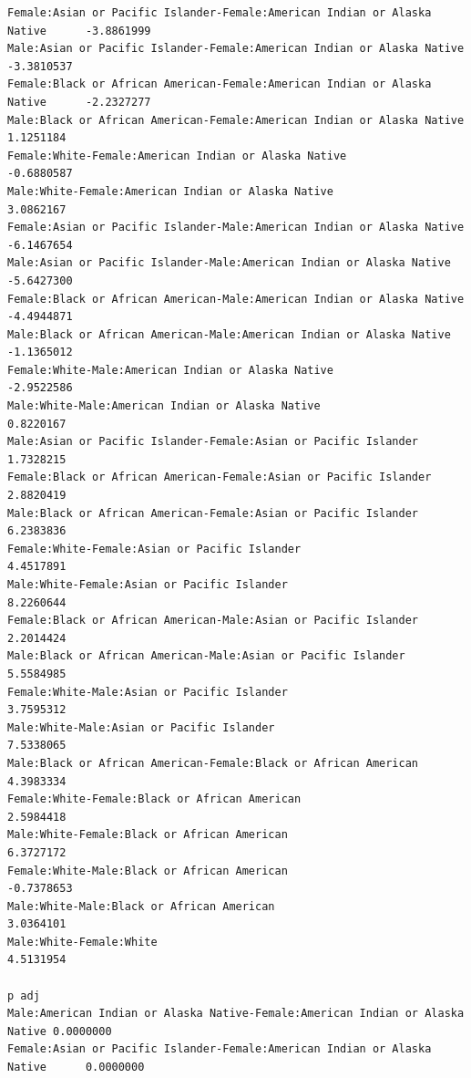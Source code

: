 \documentclass[
  letterpaper,
  DIV=11,
  numbers=noendperiod]{scrartcl}
\begin{document}
\begin{verbatim}
Female:Asian or Pacific Islander-Female:American Indian or Alaska Native      -3.8861999
Male:Asian or Pacific Islander-Female:American Indian or Alaska Native        -3.3810537
Female:Black or African American-Female:American Indian or Alaska Native      -2.2327277
Male:Black or African American-Female:American Indian or Alaska Native         1.1251184
Female:White-Female:American Indian or Alaska Native                          -0.6880587
Male:White-Female:American Indian or Alaska Native                             3.0862167
Female:Asian or Pacific Islander-Male:American Indian or Alaska Native        -6.1467654
Male:Asian or Pacific Islander-Male:American Indian or Alaska Native          -5.6427300
Female:Black or African American-Male:American Indian or Alaska Native        -4.4944871
Male:Black or African American-Male:American Indian or Alaska Native          -1.1365012
Female:White-Male:American Indian or Alaska Native                            -2.9522586
Male:White-Male:American Indian or Alaska Native                               0.8220167
Male:Asian or Pacific Islander-Female:Asian or Pacific Islander                1.7328215
Female:Black or African American-Female:Asian or Pacific Islander              2.8820419
Male:Black or African American-Female:Asian or Pacific Islander                6.2383836
Female:White-Female:Asian or Pacific Islander                                  4.4517891
Male:White-Female:Asian or Pacific Islander                                    8.2260644
Female:Black or African American-Male:Asian or Pacific Islander                2.2014424
Male:Black or African American-Male:Asian or Pacific Islander                  5.5584985
Female:White-Male:Asian or Pacific Islander                                    3.7595312
Male:White-Male:Asian or Pacific Islander                                      7.5338065
Male:Black or African American-Female:Black or African American                4.3983334
Female:White-Female:Black or African American                                  2.5984418
Male:White-Female:Black or African American                                    6.3727172
Female:White-Male:Black or African American                                   -0.7378653
Male:White-Male:Black or African American                                      3.0364101
Male:White-Female:White                                                        4.5131954
                                                                                  p adj
Male:American Indian or Alaska Native-Female:American Indian or Alaska Native 0.0000000
Female:Asian or Pacific Islander-Female:American Indian or Alaska Native      0.0000000

\end{verbatim}
\end{document}
